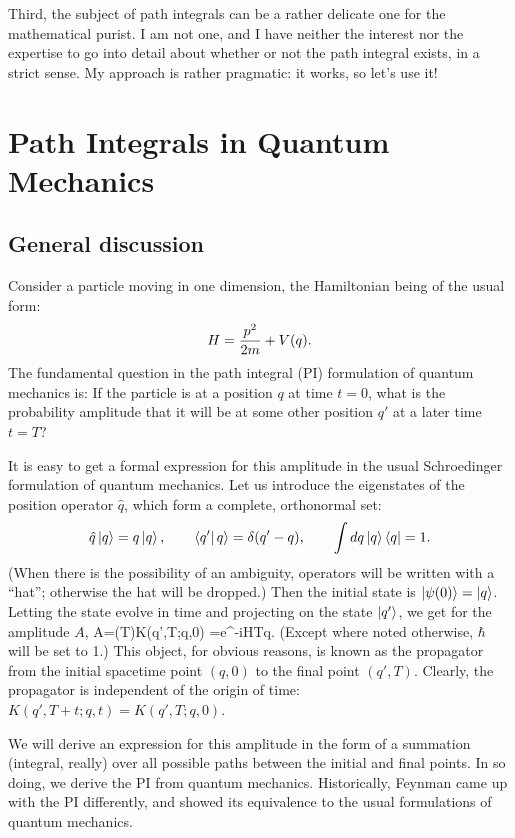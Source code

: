 \documentclass[12pt]{article}
\begin{document}
Third, the subject of path integrals can be a rather delicate one for
the mathematical purist. I am not one, and I have neither the interest
nor the expertise to go into detail about whether or not the path
integral exists, in a strict sense. My approach is rather pragmatic:
it works, so let's use it!



\section{Path Integrals in Quantum Mechanics}

\subsection{General discussion}
Consider a particle moving in one dimension, the Hamiltonian being of
the usual form:
\[ H={p^2\over2m}+V(q).\]
The fundamental question in the path integral (PI) formulation of
quantum mechanics is: If the particle is at a position $q$ at
time $t=0$, what is the probability amplitude that it will be at some
other position $q'$ at a later time $t=T$?

It is easy to get a formal expression for
this amplitude in the usual Schroedinger
formulation of quantum mechanics. Let us introduce the
eigenstates of the position operator $\hat q$, which form a complete,
orthonormal set:
\[ \hat q\left|q\right\rangle=q\left|q\right\rangle,\qquad \left\langle q'\right|q\rangle=\delta(q'-q),
\qquad \int dq\left|q\right\rangle\left\langle q\right|=1.\]
(When there is the possibility of an ambiguity, operators will be 
written with a ``hat''; otherwise the hat will be dropped.)
Then the initial state is $\left|\psi(0)\right\rangle=\left|q\right\rangle$. Letting the state
evolve in time and projecting on the state $\left|q'\right\rangle$, we get for the
amplitude $A$,
\beq A=\psi(T)\rangle\equiv K(q',T;q,0)
=e^{-iHT}\ket q.\label{ampl} \eeq
(Except where noted otherwise, $\hbar$ will be set to 1.)
This object, for obvious reasons, is known as the propagator from the
initial spacetime point $(q,0)$ to the final point $(q',T)$. Clearly,
the propagator is independent of the origin of time:
$K(q',T+t;q,t)=K(q',T;q,0)$.

We will derive an expression for this amplitude in the form of a
summation (integral, really) over all possible paths between the
initial and final points. In so doing, we derive the PI
from quantum mechanics. Historically, Feynman came up with the PI
differently, and showed its equivalence to the usual formulations
of quantum mechanics.
\end{document}
